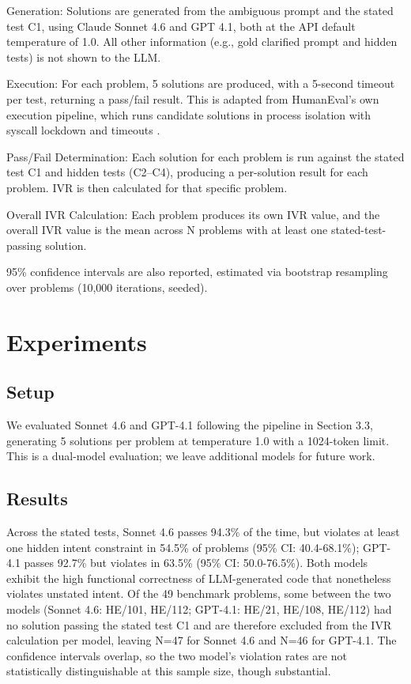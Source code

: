 \documentclass[11pt]{article}
\begin{document}
Generation: Solutions are generated from the ambiguous prompt and the stated test C1, using Claude Sonnet 4.6 and GPT 4.1, both at the API default temperature of 1.0. All other information (e.g., gold clarified prompt and hidden tests) is not shown to the LLM. 

Execution: For each problem, 5 solutions are produced, with a 5-second timeout per test, returning a pass/fail result. This is adapted from HumanEval's own execution pipeline, which runs candidate solutions in process isolation with syscall lockdown and timeouts \citep{chen2021codex}. 

Pass/Fail Determination: Each solution for each problem is run against the stated test C1 and hidden tests (C2--C4), producing a per-solution result for each problem. IVR is then calculated for that specific problem. 

Overall IVR Calculation: Each problem produces its own IVR value, and the overall IVR value is the mean across N problems with at least one stated-test-passing solution. 

95\% confidence intervals are also reported, estimated via bootstrap resampling over problems (10,000 iterations, seeded).

\section{Experiments}

\subsection{Setup}
We evaluated Sonnet 4.6 and GPT-4.1 following the pipeline in Section 3.3, generating 5 solutions per problem at temperature 1.0 with a 1024-token limit. This is a dual-model evaluation; we leave additional models for future work. 

\subsection{Results}
Across the stated tests, Sonnet 4.6 passes 94.3\% of the time, but violates at least one hidden intent constraint in 54.5\% of problems (95\% CI: 40.4-68.1\%); GPT-4.1 passes 92.7\% but violates in 63.5\% (95\% CI: 50.0-76.5\%). Both models exhibit the high functional correctness of LLM-generated code that nonetheless violates unstated intent. Of the 49 benchmark problems, some between the two models (Sonnet 4.6: HE/101, HE/112; GPT-4.1: HE/21, HE/108, HE/112) had no solution passing the stated test C1 and are therefore excluded from the IVR calculation per model, leaving N=47 for Sonnet 4.6 and N=46 for GPT-4.1. The confidence intervals overlap, so the two model's violation rates are not statistically distinguishable at this sample size, though substantial. 
\end{document}
